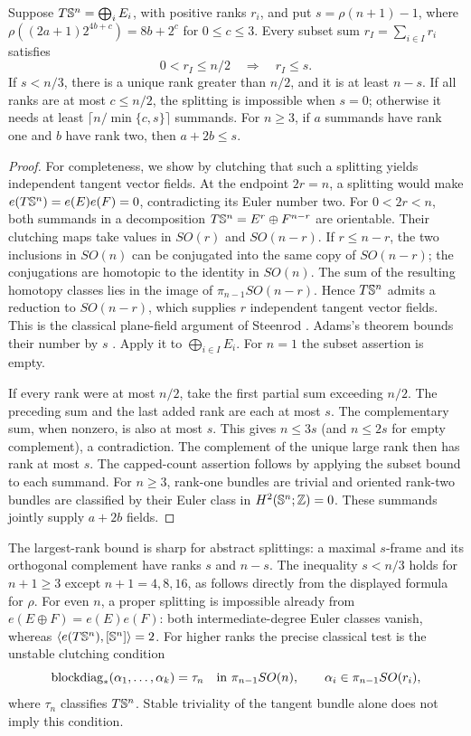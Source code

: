 \begin{proposition}
\label{prop:abstract-splitting-ranks}
Suppose $T\mathbb S^n=\bigoplus_iE_i$, with positive ranks $r_i$, and put
$s=\rho(n+1)-1$, where
$\rho((2a+1)2^{4b+c})=8b+2^c$ for $0\leq c\leq3$.
Every subset sum $r_I=\sum_{i\in I}r_i$ satisfies
\[
 0<r_I\leq n/2\quad\Longrightarrow\quad r_I\leq s.
\]
If $s<n/3$, there is a unique rank greater than $n/2$, and it is at
least $n-s$. If all ranks are at most $c\leq n/2$, the splitting is
impossible when $s=0$; otherwise it needs at least
$\lceil n/\min\{c,s\}\rceil$ summands. For $n\geq3$, if $a$ summands
have rank one and $b$ have rank two, then $a+2b\leq s$.
\end{proposition}
\begin{proof}
For completeness, we show by clutching that such a splitting yields
independent tangent vector fields. At the endpoint $2r=n$, a splitting would make
$e(T\mathbb S^n)=e(E)e(F)=0$, contradicting its Euler number two.
For $0<2r<n$, both summands in a decomposition
$T\mathbb S^n=E^r\oplus F^{n-r}$ are orientable. Their clutching maps take
values in $SO(r)$ and $SO(n-r)$. If $r\leq n-r$, the two inclusions
in $SO(n)$ can be conjugated into the same copy of $SO(n-r)$;
the conjugations are homotopic to the identity in $SO(n)$.
The sum of the resulting homotopy classes lies in the image of
$\pi_{n-1}SO(n-r)$. Hence $T\mathbb S^n$ admits a reduction to $SO(n-r)$,
which supplies $r$ independent tangent vector fields. This is the
classical plane-field argument of Steenrod
\cite{Steenrod1951}. Adams's theorem bounds their number
by $s$ \cite{Adams1962}. Apply it to $\bigoplus_{i\in I}E_i$.
For $n=1$ the subset assertion is empty.

If every rank were at most $n/2$, take the first partial sum exceeding
$n/2$. The preceding sum and the last added rank are each at most $s$.
The complementary sum, when nonzero, is also at most $s$. This gives
$n\leq3s$ (and $n\leq2s$ for empty complement), a contradiction.
The complement of the unique large rank then has rank at most $s$.
The capped-count assertion follows by applying the subset bound to each
summand. For $n\geq3$, rank-one bundles are trivial and oriented
rank-two bundles are classified by their Euler class in
$H^2(\mathbb S^n;\mathbb Z)=0$. These summands jointly supply $a+2b$ fields.
\end{proof}

The largest-rank bound is sharp for abstract splittings: a maximal
$s$-frame and its orthogonal complement have ranks $s$ and $n-s$.
The inequality $s<n/3$ holds for $n+1\geq3$ except $n+1=4,8,16$,
as follows directly from the displayed formula for $\rho$.
For even $n$, a proper splitting is impossible already from
$e(E\oplus F)=e(E)e(F)$: both intermediate-degree Euler classes vanish,
whereas $\langle e(T\mathbb S^n),[\mathbb S^n]\rangle=2$.
For higher ranks the precise classical test is the unstable clutching
condition
\[
 \operatorname{blockdiag}_*(\alpha_1,\ldots,\alpha_k)=\tau_n
 \quad\hbox{in }\pi_{n-1}SO(n),
 \qquad\alpha_i\in\pi_{n-1}SO(r_i),
\]
where $\tau_n$ classifies $T\mathbb S^n$. Stable triviality of the tangent
bundle alone does not imply this condition.

